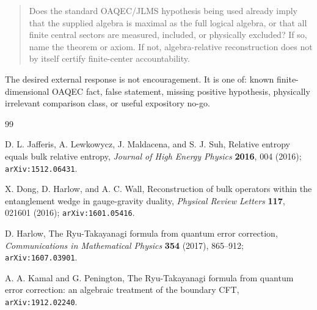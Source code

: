 \documentclass[12pt]{article}
\theoremstyle{remark}
\begin{document}
\begin{quote}
Does the standard OAQEC/JLMS hypothesis being used already imply that the
supplied algebra is maximal as the full logical algebra, or that all finite
central sectors are measured, included, or physically excluded?  If so, name
the theorem or axiom.  If not, algebra-relative reconstruction does not by
itself certify finite-center accountability.
\end{quote}

The desired external response is not encouragement.  It is one of: known
finite-dimensional OAQEC fact, false statement, missing positive hypothesis,
physically irrelevant comparison class, or useful expository no-go.

\begin{thebibliography}{99}

D. L. Jafferis, A. Lewkowycz, J. Maldacena, and S. J. Suh,
Relative entropy equals bulk relative entropy,
\emph{Journal of High Energy Physics} \textbf{2016}, 004 (2016);
\texttt{arXiv:1512.06431}.

X. Dong, D. Harlow, and A. C. Wall,
Reconstruction of bulk operators within the entanglement wedge in gauge-gravity
duality,
\emph{Physical Review Letters} \textbf{117}, 021601 (2016);
\texttt{arXiv:1601.05416}.

D. Harlow,
The Ryu-Takayanagi formula from quantum error correction,
\emph{Communications in Mathematical Physics} \textbf{354} (2017), 865--912;
\texttt{arXiv:1607.03901}.

A. A. Kamal and G. Penington,
The Ryu-Takayanagi formula from quantum error correction: an algebraic
treatment of the boundary CFT,
\texttt{arXiv:1912.02240}.

\end{thebibliography}
\end{document}
